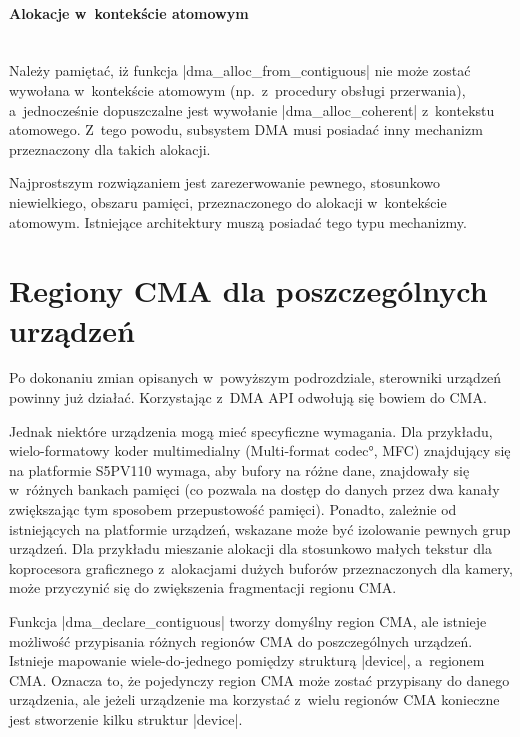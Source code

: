 \paragraph{Alokacje w~kontekście atomowym} \hspace{0pt} \\

Należy pamiętać, iż funkcja \code|dma_alloc_from_contiguous|
nie może zostać wywołana w~kontekście atomowym (np.\ z~procedury
obsługi przerwania), a~jednocześnie dopuszczalne jest wywołanie
\code|dma_alloc_coherent| z~kontekstu atomowego.  Z~tego
powodu, subsystem DMA musi posiadać inny mechanizm przeznaczony dla
takich alokacji.

Najprostszym rozwiązaniem jest zarezerwowanie pewnego, stosunkowo
niewielkiego, obszaru pamięci, przeznaczonego do alokacji w~kontekście
atomowym.  Istniejące architektury muszą posiadać tego typu
mechanizmy.


\section{Regiony CMA dla poszczególnych urządzeń}\label{sec:priv-regions}

Po dokonaniu zmian opisanych w~powyższym podrozdziale, sterowniki
urządzeń powinny już działać.  Korzystając z~DMA API odwołują się
bowiem do CMA.

Jednak niektóre urządzenia mogą mieć specyficzne wymagania.  Dla
przykładu, wielo-formatowy koder multimedialny (\ang{Multi-format
  codec}, MFC) znajdujący się na platformie S5PV110 wymaga, aby bufory
na różne dane, znajdowały się w~różnych bankach pamięci (co pozwala na
dostęp do danych przez dwa kanały zwiększając tym sposobem
przepustowość pamięci).  Ponadto, zależnie od istniejących na
platformie urządzeń, wskazane może być izolowanie pewnych grup
urządzeń.  Dla przykładu mieszanie alokacji dla stosunkowo małych
tekstur dla koprocesora graficznego z~alokacjami dużych buforów
przeznaczonych dla kamery, może przyczynić się do zwiększenia
fragmentacji regionu CMA.

Funkcja \code|dma_declare_contiguous| tworzy domyślny region
CMA, ale istnieje możliwość przypisania różnych regionów CMA do
poszczególnych urządzeń.  Istnieje mapowanie wiele-do-jednego pomiędzy
strukturą \code|device|, a~regionem CMA.  Oznacza to, że
pojedynczy region CMA może zostać przypisany do danego urządzenia, ale
jeżeli urządzenie ma korzystać z~wielu regionów CMA konieczne jest
stworzenie kilku struktur \code|device|.

